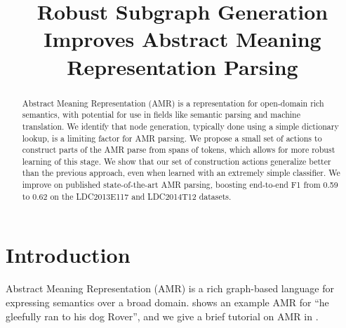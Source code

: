 \documentclass[11pt]{article}
\title{Robust Subgraph Generation Improves Abstract Meaning Representation Parsing}
\author{
}
\date{}
\begin{document}
\maketitle
\begin{abstract}


Abstract Meaning Representation (AMR) is a representation for open-domain rich semantics, with potential for use in fields like semantic parsing
  and machine translation.
We identify that node generation, typically done using a simple
  dictionary lookup, is a limiting factor for AMR parsing.
We propose a small set of actions to construct parts of the AMR parse from spans of tokens, which allows for more robust learning of this stage.
We show that our set of construction actions generalize better than the previous approach, even when learned with an extremely simple classifier.
We improve on published state-of-the-art AMR parsing, boosting end-to-end F1 from 0.59 to 0.62 on the LDC2013E117 and LDC2014T12 datasets.

\end{abstract}

\section{Introduction}


Abstract Meaning Representation (AMR) \cite{Banarescu:13} is a rich graph-based language for expressing semantics over a broad domain.
 shows an example AMR for ``he gleefully ran to his dog Rover'', and we give a brief tutorial on AMR in .
\end{document}
